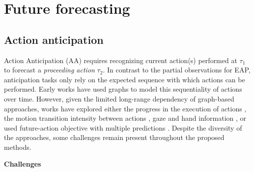 \documentclass[smallextended,twocolumn,natbib]{svjour3}
\begin{document}


\section{Future forecasting}
\label{sec:forecasting}


\subsection{Action anticipation}


Action Anticipation (AA) requires recognizing current action(s) performed at $\tau_1$ to forecast a \emph{proceeding action} $\tau_2$. In contrast to the partial observations for EAP, anticipation tasks only rely on the expected sequence with which actions can be performed. Early works \citep{kitani2012activity,kuehne2014language,koppula2015anticipating} have used graphs to model this sequentiality of actions over time. However, given the limited long-range dependency of graph-based approaches, works have explored either the progress in the execution of actions \citep{abu2018will,furnari2019would,ke2019time}, the motion transition intensity between actions \citep{huang2014action}, gaze and hand information \citep{shen2018egocentric}, or used future-action objective with multiple predictions \citep{furnari2018leveraging,zatsarynna2024gated}. Despite the diversity of the approaches, some challenges remain present throughout the proposed methods.

\noindent
\textbf{Challenges}
\end{document}
